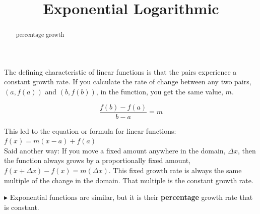 \documentclass{ximera}
\title{Exponential Logarithmic}
\begin{document}
\begin{abstract}
percentage growth
\end{abstract}
\maketitle




The defining characteristic of linear functions is that the pairs experience a constant growth rate. If you calculate the rate of change between any two pairs, $(a, f(a))$ and $(b, f(b))$, in the function, you get the same value, $m$.


\[   \frac{f(b)-f(a)}{b-a} = m       \]

This led to the equation or formula for linear functions:  $f(x) = m(x-a) + f(a)$ \\


Said another way:  If you move a fixed amount anywhere in the domain, $\Delta x$, then the function always grows by a proportionally fixed amount, $f(x + \Delta x) - f(x) = m(\Delta x)$. This fixed growth rate is always the same multiple of the change in the domain. That multiple is the constant growth rate.


$\blacktriangleright$ Exponential functions are similar, but it is their \textbf{percentage} growth rate that is constant.   \\
\end{document}
